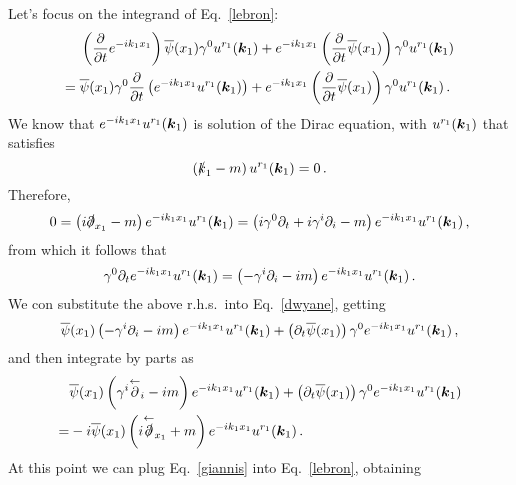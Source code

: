 \begin{sol}
\begin{equation}
    \end{equation}
    Let's focus on the integrand of Eq.~\eqref{lebron}:
    \begin{align}
        &\left( \frac{\partial}{\partial t} e^{-i k_1 x_1}\right) \overline{\psi} (x_1) \gamma^0 u^{r_1}(\boldsymbol{k}_1) + e^{-i k_1 x_1} \left( \frac{\partial}{\partial t} \overline{\psi}(x_1)\right) \gamma^0 u^{r_1}(\boldsymbol{k}_1) \notag \\
        ={}& \overline{\psi}(x_1) \gamma^0 \frac{\partial}{\partial t} \left( e^{-i k_1 x_1} u^{r_1}(\boldsymbol{k}_1) \right) + e^{-i k_1 x_1} \left( \frac{\partial}{\partial t} \overline{\psi}(x_1) \right) \gamma^0 u^{r_1}(\boldsymbol{k}_1) \,.\label{dwyane}
    \end{align}
    We know that $e^{-i k_1 x_1} u^{r_1}(\boldsymbol{k}_1)$ is solution of the Dirac equation, with $u^{r_1}(\boldsymbol{k}_1)$ that satisfies 
    \begin{equation}
        \left( \slashed{k}_1 -m \right) u^{r_1}(\boldsymbol{k}_1) =0 \, .
    \end{equation}
    Therefore,
    \begin{equation}
        0 = \left( i \slashed{\partial}_{x_1} - m\right) e^{-i k_1 x_1} u^{r_1}(\boldsymbol{k}_1) = \left( i \gamma^0 \partial_t + i \gamma^i \partial_i - m\right) e^{-i k_1 x_1} u^{r_1}(\boldsymbol{k}_1) \,,
    \end{equation}
    from which it follows that
    \begin{equation}
        \gamma^0 \partial_t e^{-i k_1 x_1} u^{r_1}(\boldsymbol{k}_1) = \left(- \gamma^i \partial_i - i m \right) e^{-i k_1 x_1} u^{r_1}(\boldsymbol{k}_1) \,.
    \end{equation}
    We con substitute the above r.h.s.\ into Eq.~\eqref{dwyane}, getting
    \begin{equation}
        \overline{\psi}(x_1) \left( - \gamma^i \partial_i - i m  \right) e^{-i k_1 x_1} u^{r_1}(\boldsymbol{k}_1) + \left( \partial_t \overline{\psi}(x_1)\right) \gamma^0 e^{-i k_1 x_1} u^{r_1}(\boldsymbol{k}_1) \,,
    \end{equation}
    and then integrate by parts as
    \begin{align}
        & \overline{\psi}(x_1) \left( \gamma^i \overset{\leftarrow}{\partial}_i -im\right) e^{-i k_1 x_1} u^{r_1}(\boldsymbol{k}_1) + \left( \partial_t \overline{\psi}(x_1)\right) \gamma^0 e^{-i k_1 x_1} u^{r_1}(\boldsymbol{k}_1) \notag \\
        = & -i \overline{\psi}(x_1) \left( i \overset{\leftarrow}{\slashed{\partial}}_{x_1} + m\right)e^{-i k_1 x_1} u^{r_1}(\boldsymbol{k}_1) \,.\label{giannis}
    \end{align}
    At this point we can plug Eq.~\eqref{giannis} into Eq.~\eqref{lebron}, obtaining

\end{sol}
